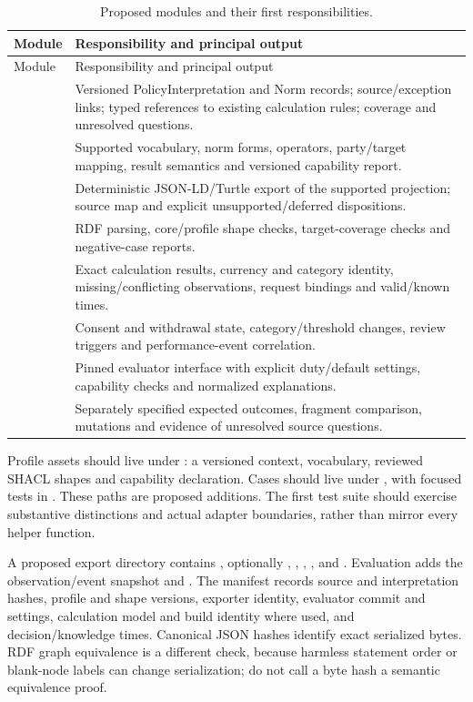 \begin{longtable}{P{31mm}P{117mm}}
\caption{Proposed modules and their first responsibilities.}
\label{tab:odrl-proposed-modules}\\
\toprule
Module & Responsibility and principal output\\
\midrule
\endfirsthead
\toprule
Module & Responsibility and principal output\\
\midrule
\endhead
\bottomrule
\endfoot
{} & Versioned PolicyInterpretation and Norm records; source/exception links; typed references to existing calculation rules; coverage and unresolved questions.\\
 & Supported vocabulary, norm forms, operators, party/target mapping, result semantics and versioned capability report.\\
 & Deterministic JSON-LD/Turtle export of the supported projection; source map and explicit unsupported/deferred dispositions.\\
 & RDF parsing, core/profile shape checks, target-coverage checks and negative-case reports.\\
 & Exact calculation results, currency and category identity, missing/conflicting observations, request bindings and valid/known times.\\
 & Consent and withdrawal state, category/threshold changes, review triggers and performance-event correlation.\\
 & Pinned evaluator interface with explicit duty/default settings, capability checks and normalized explanations.\\
 & Separately specified expected outcomes, fragment comparison, mutations and evidence of unresolved source questions.\\
\end{longtable}

Profile assets should live under : a versioned
context, vocabulary, reviewed SHACL shapes and capability declaration.
Cases should live under , with focused
tests in . These paths are proposed additions. The first
test suite should exercise substantive distinctions and actual adapter
boundaries, rather than mirror every helper function.

A proposed export directory contains , optionally
, , ,
,  and
. Evaluation adds the observation/event snapshot and
. The manifest records source and interpretation hashes,
profile and shape versions, exporter identity, evaluator commit and settings,
calculation model and build identity where used, and decision/knowledge times.
Canonical JSON hashes identify exact serialized bytes. RDF graph equivalence
is a different check, because harmless statement order or blank-node labels
can change serialization; do not call a byte hash a semantic equivalence proof.

